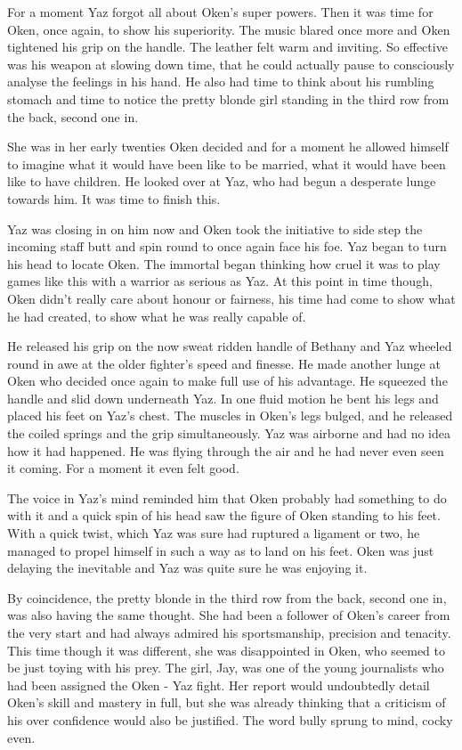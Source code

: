For a moment Yaz forgot all about Oken's super powers.  Then it was time for Oken, once again, to show his superiority.  The music blared once more and Oken tightened his grip on the handle.  The leather felt warm and inviting.  So effective was his weapon at slowing down time, that he could actually pause to consciously analyse the feelings in his hand.  He also had time to think about his rumbling stomach and time to notice the pretty blonde girl standing in the third row from the back, second one in.

She was in her early twenties Oken decided and for a moment he allowed himself to imagine what it would have been like to be married, what it would have been like to have children.  He looked over at Yaz, who had begun a desperate lunge towards him.  It was time to finish this.

Yaz was closing in on him now and Oken took the initiative to side step the incoming staff butt and spin round to once again face his foe.  Yaz began to turn his head to locate Oken.  The immortal began thinking how cruel it was to play games like this with a warrior as serious as Yaz.  At this point in time though, Oken didn't really care about honour or fairness, his time had come to show what he had created, to show what he was really capable of.

He released his grip on the now sweat ridden handle of Bethany and Yaz wheeled round in awe at the older fighter's speed and finesse.  He made another lunge at Oken who decided once again to make full use of his advantage.  He squeezed the handle and slid down underneath Yaz. In one fluid motion he bent his legs and placed his feet on Yaz's chest.  The muscles in Oken's legs bulged, and he released the coiled springs and the grip simultaneously.  Yaz was airborne and had no idea how it had happened.  He was flying through the air and he had never even seen it coming.  For a moment it even felt good.

The voice in Yaz's mind reminded him that Oken probably had something to do with it and a quick spin of his head saw the figure of Oken standing to his feet.  With a quick twist, which Yaz was sure had ruptured a ligament or two, he managed to propel himself in such a way as to land on his feet.  Oken was just delaying the inevitable and Yaz was quite sure he was enjoying it.

By coincidence, the pretty blonde in the third row from the back, second one in, was also having the same thought.  She had been a follower of Oken's career from the very start and had always admired his sportsmanship, precision and tenacity.  This time though it was different, she was disappointed in Oken, who seemed to be just toying with his prey.  The girl, Jay, was one of the young journalists who had been assigned the Oken - Yaz fight.  Her report would undoubtedly detail Oken's skill and mastery in full, but she was already thinking that a criticism of his over confidence would also be justified.  The word bully sprung to mind, cocky even.

